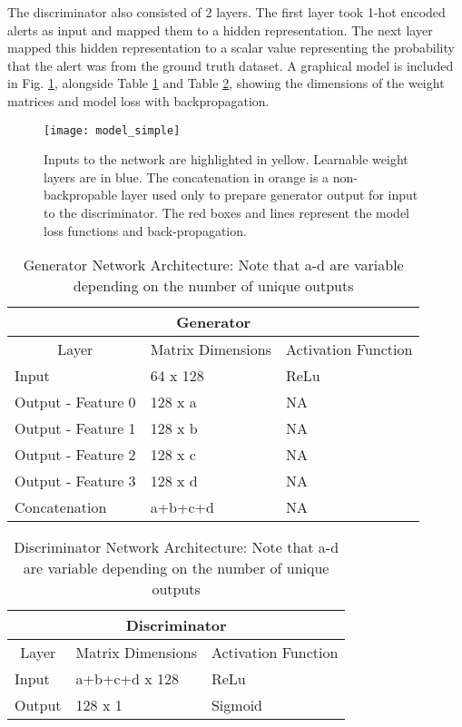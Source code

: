 The discriminator also consisted of 2 layers. The first layer took 1-hot encoded alerts as input and mapped them to a hidden representation. The next layer mapped this hidden representation to a scalar value representing the probability that the alert was from the ground truth dataset. A graphical model is included in Fig. \ref{fig:model_simple}, alongside Table \ref{tab:model_simple_a} and Table \ref{tab:model_simple_b}, showing the dimensions of the weight matrices and model loss with backpropagation.

\begin{figure}[!htbp]
	\centering%
	\texttt{[image: model\_simple]}
	\caption{
		Inputs to the network are highlighted in yellow. Learnable weight layers are in blue. The concatenation in orange is a non-backpropable layer used only to prepare generator output for input to the discriminator. The red boxes and lines represent the model loss functions and back-propagation.
	}
	\label{fig:model_simple}
\end{figure}


\begin{table}[!htbp]
	\centering
	\label{tab:model_simple_a}
	\caption{Generator Network Architecture: Note that a-d are variable depending on the number of unique outputs}
	\begin{tabular}{l|l|l}
		\hline
		\multicolumn{3}{c}{\textbf{Generator}} \\ 
		\hline
		\multicolumn{1}{c|}{Layer} & \multicolumn{1}{c|}{Matrix Dimensions} & \multicolumn{1}{c}{Activation Function} \\ \hline
		Input & 64 x 128 & ReLu \\
		Output - Feature 0 & 128 x a & NA \\
		Output - Feature 1 & 128 x b & NA \\
		Output - Feature 2 & 128 x c & NA \\
		Output  - Feature 3 & 128 x d & NA \\
		Concatenation & a+b+c+d & NA \\
		\hline
	\end{tabular}
\end{table}

\begin{table}[!htbp]
	\centering
	\label{tab:model_simple_b}
	\caption{Discriminator Network Architecture: Note that a-d are variable depending on the number of unique outputs}
	\begin{tabular}{l|l|l}
		\hline
		\multicolumn{3}{c}{\textbf{Discriminator}} \\ 
		\hline
		\multicolumn{1}{c|}{Layer} & \multicolumn{1}{c|}{Matrix Dimensions} & \multicolumn{1}{c}{Activation Function} \\ \hline
		Input & a+b+c+d x 128 & ReLu \\
		Output & 128 x 1 & Sigmoid \\
		\hline
	\end{tabular}
\end{table}


